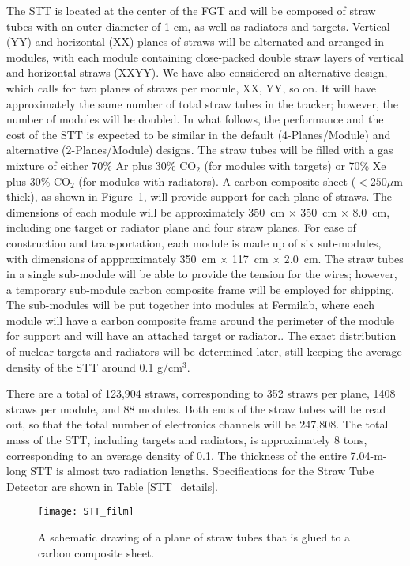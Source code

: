 \documentclass[aps,prl,preprint,groupedaddress]{revtex4}
\begin{document}
The STT is located at the center of the FGT and 
will be composed of straw tubes with an outer diameter of 1 cm, as well as 
radiators and targets. 
Vertical (YY) and horizontal (XX) planes of straws will be alternated and 
arranged in modules, with each module containing close-packed double straw layers 
of vertical and horizontal straws (XXYY). 
We have also considered an alternative design, which calls for two planes of straws
per module, XX, YY, so on. It will have approximately the same number of
total straw tubes in the tracker; however, the number of modules will be doubled.
In what follows, the performance and the cost of the STT is expected to be similar 
in the default (4-Planes/Module) and alternative (2-Planes/Module) designs.
The straw tubes will be filled with a
gas mixture of either 70\% Ar plus 30\% CO$_2$ (for modules with targets) or
70\% Xe plus 30\% CO$_2$ (for modules with radiators).
A carbon composite sheet ($< 250 \mu$m thick), as shown in Figure~\ref{STT_film}, 
will provide support for each plane of straws. 
The dimensions of each module will
be approximately 350~cm $\times$ 350~cm $\times$ 8.0~cm, including one
target or radiator plane and four straw planes. For ease of construction and
transportation, each module is made up of six sub-modules, with dimensions of
appproximately 350~cm $\times$ 117~cm $\times$ 2.0~cm. 
The straw tubes in a single sub-module will be able to provide the tension 
for the wires; however, a temporary sub-module carbon composite frame will 
be employed for shipping. The sub-modules will be put together into modules 
at Fermilab, where each module will have a carbon composite frame around 
the perimeter of the module for support and will have an attached target or radiator..
The exact distribution of 
nuclear targets and radiators will be determined later, still keeping the 
average density of the STT around 0.1 g/cm$^3$.  

There are a total of 123,904 straws, corresponding to 352 straws per plane,
1408 straws per module,
and 88 modules. Both ends of the straw tubes will be read out, so that the total
number of electronics channels will be 247,808. 
The total mass of the STT, including targets and radiators, is approximately 8 
tons, corresponding to an average density of 0.1. 
The thickness of the entire 7.04-m-long STT is almost two 
radiation lengths. Specifications for the Straw Tube Detector are shown in Table \ref{STT_details}.

\begin{figure}
\begin{center}
\texttt{[image: STT\_film]}
\caption[Plane of straw tubes glued to carbon composite sheet]{\label{STT_film} A schematic drawing of a plane of straw tubes that is
glued to a carbon composite sheet.} 
\end{center}
\end{figure}
\end{document}
